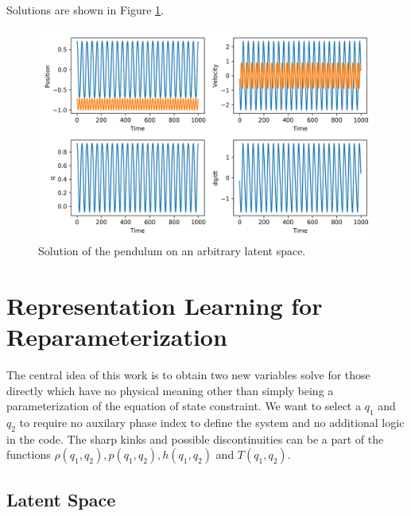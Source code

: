\documentclass[AMA,STIX1COL]{WileyNJD-v2}
\begin{document}
Solutions are shown in Figure \ref{fig:pendulum}.
\begin{figure}
\centering
\includegraphics[width=5in]{../figures/pendulum_q.png}
\caption{\label{fig:pendulum}Solution of the pendulum on an arbitrary latent space.}
\end{figure}

\hypertarget{header-n3294}{%
\section{Representation Learning for
Reparameterization}\label{header-n3294}}

The central idea of this work is to obtain two new variables solve for
those directly which have no physical meaning other than simply being a
parameterization of the equation of state constraint. We want to select a
\(q_1\) and \(q_2\) to require no auxilary phase index to define the system
and no additional logic in the code. The sharp kinks and possible
discontinuities can be a part of the functions
\(\rho(q_1, q_2), p(q_1, q_2), h(q_1, q_2)\) and \(T(q_1, q_2)\).


\hypertarget{header-n3299}{%
\subsection{Latent Space}\label{header-n3299}}
\end{document}
